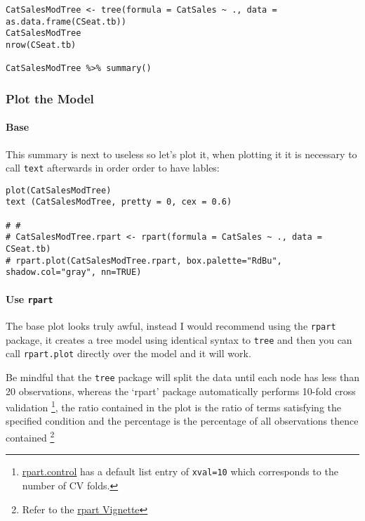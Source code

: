 \documentclass[
]{article}
\newcommand{\passthrough}[1]{#1}
\begin{document}
\begin{lstlisting}
CatSalesModTree <- tree(formula = CatSales ~ ., data = as.data.frame(CSeat.tb))
CatSalesModTree
nrow(CSeat.tb)

CatSalesModTree %>% summary()
\end{lstlisting}

\hypertarget{plot-the-model}{%
\subsubsection{Plot the Model}\label{plot-the-model}}

\hypertarget{base}{%
\paragraph{Base}\label{base}}

This summary is next to useless so let's plot it, when plotting it it is
necessary to call \passthrough{\lstinline!text!} afterwards in order
order to have lables:

\begin{lstlisting}
plot(CatSalesModTree)
text (CatSalesModTree, pretty = 0, cex = 0.6)

# #
# CatSalesModTree.rpart <- rpart(formula = CatSales ~ ., data = CSeat.tb)
# rpart.plot(CatSalesModTree.rpart, box.palette="RdBu", shadow.col="gray", nn=TRUE)
\end{lstlisting}

\hypertarget{use-rpart}{%
\paragraph{\texorpdfstring{Use
\texttt{rpart}}{Use rpart}}\label{use-rpart}}

The base plot looks truly awful, instead I would recommend using the
\passthrough{\lstinline!rpart!} package, it creates a tree model using
identical syntax to \passthrough{\lstinline!tree!} and then you can call
\passthrough{\lstinline!rpart.plot!} directly over the model and it will
work.

Be mindful that the \passthrough{\lstinline!tree!} package will split
the data until each node has less than 20 observations, whereas the
`rpart' package automatically performs 10-fold cross validation
\footnote{\href{https://www.rdocumentation.org/packages/rpart/versions/4.1-15/topics/rpart.control}{rpart.control}
  has a default list entry of \passthrough{\lstinline!xval=10!} which
  corresponds to the number of CV folds.}, the ratio contained in the
plot is the ratio of terms satisfying the specified condition and the
percentage is the percentage of all observations thence contained
\footnote{Refer to the
  \href{http://www.milbo.org/rpart-plot/prp.pdf}{rpart Vignette}}
\end{document}
